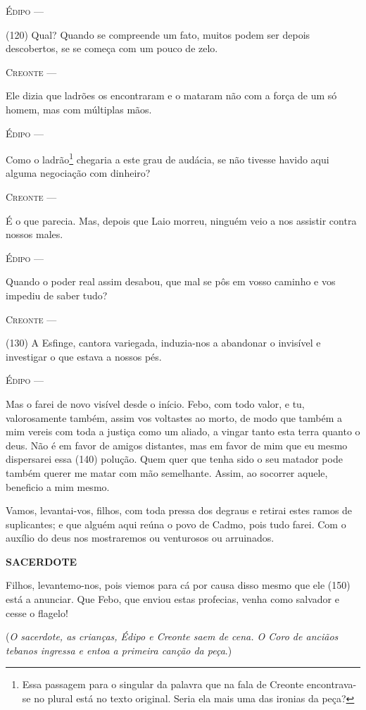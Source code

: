 \textsc{Édipo} ---

(120) Qual? Quando se compreende um fato, muitos podem ser depois
descobertos, se se começa com um pouco de zelo.

\textsc{Creonte} ---

Ele dizia que ladrões os encontraram e o mataram não com a força de um
só homem, mas com múltiplas mãos.

\textsc{Édipo} ---

Como o ladrão\footnote{Essa passagem para o singular da palavra que na
  fala de Creonte encontrava-se no plural está no texto original. Seria
  ela mais uma das ironias da peça?} chegaria a este grau de audácia, se
não tivesse havido aqui alguma negociação com dinheiro?

\textsc{Creonte} ---

É o que parecia. Mas, depois que Laio morreu, ninguém veio a nos
assistir contra nossos males.

\textsc{Édipo} ---

Quando o poder real assim desabou, que mal se pôs em vosso caminho e vos
impediu de saber tudo?

\textsc{Creonte} ---

(130) A Esfinge, cantora variegada, induzia-nos a abandonar o invisível
e investigar o que estava a nossos pés.

\textsc{Édipo} ---

Mas o farei de novo visível desde o início. Febo, com todo valor, e tu,
valorosamente também, assim vos voltastes ao morto, de modo que também a
mim vereis com toda a justiça como um aliado, a vingar tanto esta terra
quanto o deus. Não é em favor de amigos distantes, mas em favor de mim
que eu mesmo dispersarei essa (140) polução. Quem quer que tenha sido o
seu matador pode também querer me matar com mão semelhante. Assim, ao
socorrer aquele, beneficio a mim mesmo.

Vamos, levantai-vos, filhos, com toda pressa dos degraus e retirai estes
ramos de suplicantes; e que alguém aqui reúna o povo de Cadmo, pois tudo
farei. Com o auxílio do deus nos mostraremos ou venturosos ou
arruinados.

\textbf{SACERDOTE }

Filhos, levantemo-nos, pois viemos para cá por causa disso mesmo que ele
(150) está a anunciar. Que Febo, que enviou estas profecias, venha como
salvador e cesse o flagelo!

(\emph{O sacerdote, as crianças, Édipo e Creonte saem de cena. O Coro de
anciãos tebanos ingressa e entoa a primeira canção da peça}.)

